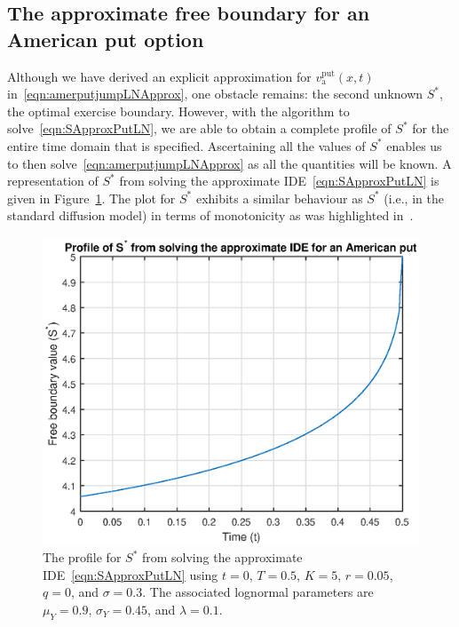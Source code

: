 \subsection{The approximate free boundary for an American put option}
Although we have derived an explicit approximation for $v_{\text{a}}^{\text{put}}(x,t)$ in~\eqref{eqn:amerputjumpLNApprox}, one obstacle remains: the second unknown $S^*$, the optimal exercise boundary. However, with the algorithm to solve~\eqref{eqn:SApproxPutLN}, we are able to obtain a complete profile of $S^*$ for the entire time domain that is specified. Ascertaining all the values of $S^*$ enables us to then solve~\eqref{eqn:amerputjumpLNApprox} as all the quantities will be known. A representation of $S^*$ from solving the approximate IDE~\eqref{eqn:SApproxPutLN} is given in Figure~\ref{fig:amerputFreeBoundary}. The plot for $S^*$ exhibits a similar behaviour as $S^*$ (i.e., in the standard diffusion model) in terms of monotonicity as was highlighted in~\cite{Rodrigo2013}.
	\begin{figure}[!h]
		\centering
		\includegraphics[scale=0.8]{figures/SfreePut.eps}
		\caption{The profile for $S^*$ from solving the approximate IDE~\eqref{eqn:SApproxPutLN} using $t=0$, $T=0.5$, $K = 5$, $r=0.05$, $q=0$, and $\sigma = 0.3$. The associated lognormal parameters are $\mu_Y = 0.9$, $\sigma_Y = 0.45$, and $\lambda = 0.1$.}
		\label{fig:amerputFreeBoundary}
	\end{figure}

